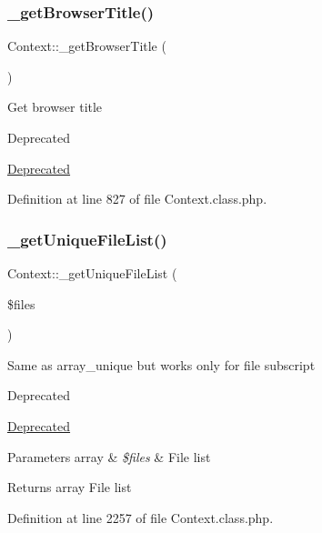 \subsubsection{\texorpdfstring{\+\_\+get\+Browser\+Title()}{\_getBrowserTitle()}}
{\footnotesize\ttfamily Context\+::\+\_\+get\+Browser\+Title (\begin{DoxyParamCaption}{ }\end{DoxyParamCaption})}

Get browser title \begin{DoxyRefDesc}{Deprecated}
\item[\hyperlink{deprecated__deprecated000001}{Deprecated}]\end{DoxyRefDesc}


Definition at line 827 of file Context.\+class.\+php.

\hypertarget{classContext_a8bde0f7d77424555f9b856664b59e0bc}{}\label{classContext_a8bde0f7d77424555f9b856664b59e0bc} 
\subsubsection{\texorpdfstring{\+\_\+get\+Unique\+File\+List()}{\_getUniqueFileList()}}
{\footnotesize\ttfamily Context\+::\+\_\+get\+Unique\+File\+List (\begin{DoxyParamCaption}\item[{}]{\$files }\end{DoxyParamCaption})}

Same as array\+\_\+unique but works only for file subscript

\begin{DoxyRefDesc}{Deprecated}
\item[\hyperlink{deprecated__deprecated000006}{Deprecated}]\end{DoxyRefDesc}

\begin{DoxyParams}[1]{Parameters}
array & {\em \$files} & File list \\
\hline
\end{DoxyParams}
\begin{DoxyReturn}{Returns}
array File list 
\end{DoxyReturn}


Definition at line 2257 of file Context.\+class.\+php.

\hypertarget{classContext_a3ad6fc7782e7234fe77357da28218310}{}\label{classContext_a3ad6fc7782e7234fe77357da28218310} 
